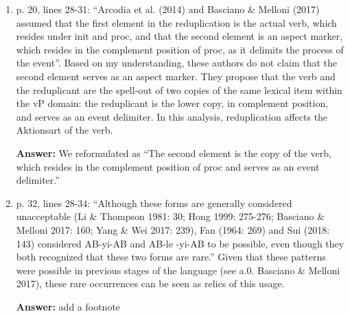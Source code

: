 \documentclass[fleqn,twoside]{article}
\begin{document}
\begin{enumerate}
\item
p. 20, lines 28-31: “Arcodia et al. (2014) and Basciano \& Melloni (2017) assumed that the first
element in the reduplication is the actual verb, which resides under init and proc, and that the
second element is an aspect marker, which resides in the complement position of proc, as it delimits
the process of the event”. Based on my understanding, these authors do not claim that the second
element serves as an aspect marker. They propose that the verb and the reduplicant are the spell-out
of two copies of the same lexical item within the vP domain: the reduplicant is the lower copy, in
complement position, and serves as an event delimiter. In this analysis, reduplication affects the Aktionsart of the verb.

\noindent
\textbf{Answer:} We reformulated as ``The second element is the copy of the verb, which resides in the complement position of proc and serves as an event delimiter.''

\item
p. 32, lines 28-34: “Although these forms are generally considered unacceptable (Li \& Thompson 1981: 30; Hong 1999: 275-276; Basciano \& Melloni 2017: 160; Yang \& Wei 2017: 239), Fan (1964: 269) and Sui (2018: 143) considered AB-yi-AB and AB-le -yi-AB to be possible, even though they both recognized that these two forms are rare.” Given that these patterns were possible in previous stages of the language (see a.0. Basciano \& Melloni 2017), these rare occurrences can be seen as relics of this usage.

\textbf{Answer:} add a footnote
\end{enumerate}
\end{document}
